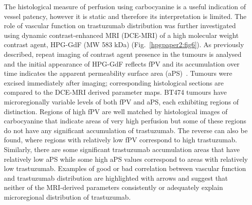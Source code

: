 The histological measure of perfusion using carbocyanine is a useful indication of vessel patency, however it is static and therefore its interpretation is limited.
The role of vascular function on trastuzumab distribution was further investigated using dynamic contrast-enhanced MRI (DCE-MRI) of a high molecular weight contrast agent, \acs{HPG-GdF} (MW 583 kDa) (Fig.~\ref{hpgpaper2:fig6}).
As previously described, repeat imaging of contrast agent presence in the tumours is analysed and the initial appearance of \acs{HPG-GdF} reflects \acs{fPV} and its accumulation over time indicates the apparent permeability surface area (aPS)~\cite{Baker:2015cob}.
Tumours were excised immediately after imaging; corresponding histological sections are compared to the DCE-MRI derived parameter maps.
\acs{BT474} tumours have microregionally variable levels of both \acs{fPV} and \acs{aPS}, each exhibiting regions of distinction.
Regions of high \acs{fPV} are well matched by histological images of carbocyanine that indicate areas of very high perfusion but some of these regions do not have any significant accumulation of trastuzumab.
The reverse can also be found, where regions with relatively low \acs{fPV} correspond to high trastuzumab.
Similarly, there are some significant trastuzumab accumulation areas that have relatively low \acs{aPS} while some high \acs{aPS} values correspond to areas with relatively low trastuzumab.
Examples of good or bad correlation between vascular function and trastuzumab distribution are highlighted with arrows and suggest that neither of the MRI-derived parameters consistently or adequately explain microregional distribution of trastuzumab.

